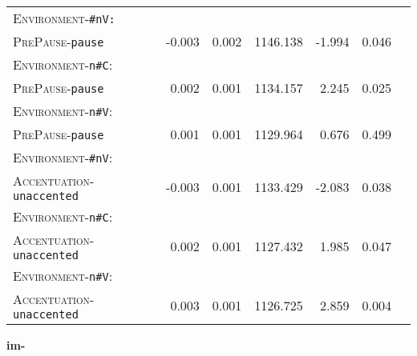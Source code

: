 \begin{table}[H]
\begin{center}
{\begin{tabular} {lrrrrrr}
		\textsc{Environment}-\texttt{\#nV:}&&&&&\\
		\textsc{PrePause}-\texttt{pause} & -0.003 & 0.002 & 1146.138 & -1.994 & 0.046 \\ 
		
		\textsc{Environment}-\texttt{n\#C}:&&&&&\\
		\textsc{PrePause}-\texttt{pause} & 0.002 & 0.001 & 1134.157 & 2.245 & 0.025 \\ 
		
		\textsc{Environment}-\texttt{n\#V}:&&&&&\\
		\textsc{PrePause}-\texttt{pause} & \color[HTML]{9B9B9B} 0.001 & \color[HTML]{9B9B9B} 0.001 & \color[HTML]{9B9B9B} 1129.964 & \color[HTML]{9B9B9B} 0.676 & \color[HTML]{9B9B9B} 0.499 \\ 
		
		\textsc{Environment}-\texttt{\#nV}:&&&&&\\
		\textsc{Accentuation}-\texttt{unaccented} & -0.003 & 0.001 & 1133.429 & -2.083 & 0.038 \\ 
		
		\textsc{Environment}-\texttt{n\#C}:&&&&&\\
		\textsc{Accentuation}-\texttt{unaccented} & 0.002 & 0.001 & 1127.432 & 1.985 & 0.047 \\ 
		
		\textsc{Environment}-\texttt{n\#V}:&&&&&\\
		\textsc{Accentuation}-\texttt{unaccented} & 0.003 & 0.001 & 1126.725 & 2.859 & 0.004 \\ 
		\hline
		
			\end{tabular}
}
\end{center}

\end{table}
\vspace*{-0.3cm}

\clearpage

\textbf{{im-}}

